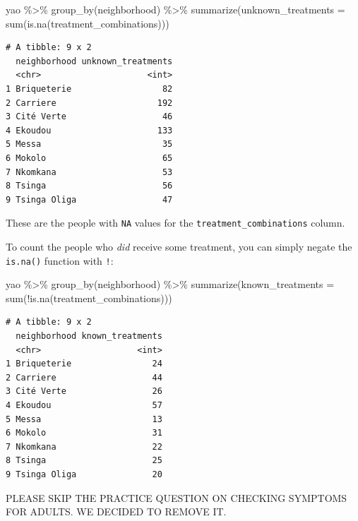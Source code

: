 \documentclass[
  letterpaper,
  DIV=11,
  numbers=noendperiod]{scrreprt}
\newenvironment{Shaded}{\begin{snugshade}}{\end{snugshade}}
\newcommand{\AttributeTok}[1]{\textcolor[rgb]{0.40,0.45,0.13}{#1}}
\newcommand{\FunctionTok}[1]{\textcolor[rgb]{0.28,0.35,0.67}{#1}}
\newcommand{\NormalTok}[1]{\textcolor[rgb]{0.00,0.23,0.31}{#1}}
\newcommand{\SpecialCharTok}[1]{\textcolor[rgb]{0.37,0.37,0.37}{#1}}
\begin{document}
\begin{Shaded}
\begin{Highlighting}[]
\NormalTok{yao }\SpecialCharTok{\%\textgreater{}\%} 
  \FunctionTok{group\_by}\NormalTok{(neighborhood) }\SpecialCharTok{\%\textgreater{}\%} 
  \FunctionTok{summarize}\NormalTok{(}\AttributeTok{unknown\_treatments =} \FunctionTok{sum}\NormalTok{(}\FunctionTok{is.na}\NormalTok{(treatment\_combinations)))}
\end{Highlighting}
\end{Shaded}

\begin{verbatim}
# A tibble: 9 x 2
  neighborhood unknown_treatments
  <chr>                     <int>
1 Briqueterie                  82
2 Carriere                    192
3 Cité Verte                   46
4 Ekoudou                     133
5 Messa                        35
6 Mokolo                       65
7 Nkomkana                     53
8 Tsinga                       56
9 Tsinga Oliga                 47
\end{verbatim}

These are the people with \texttt{NA} values for the
\texttt{treatment\_combinations} column.

To count the people who \emph{did} receive some treatment, you can
simply negate the \texttt{is.na()} function with \texttt{!}:

\begin{Shaded}
\begin{Highlighting}[]
\NormalTok{yao }\SpecialCharTok{\%\textgreater{}\%} 
  \FunctionTok{group\_by}\NormalTok{(neighborhood) }\SpecialCharTok{\%\textgreater{}\%} 
  \FunctionTok{summarize}\NormalTok{(}\AttributeTok{known\_treatments =} \FunctionTok{sum}\NormalTok{(}\SpecialCharTok{!}\FunctionTok{is.na}\NormalTok{(treatment\_combinations)))}
\end{Highlighting}
\end{Shaded}

\begin{verbatim}
# A tibble: 9 x 2
  neighborhood known_treatments
  <chr>                   <int>
1 Briqueterie                24
2 Carriere                   44
3 Cité Verte                 26
4 Ekoudou                    57
5 Messa                      13
6 Mokolo                     31
7 Nkomkana                   22
8 Tsinga                     25
9 Tsinga Oliga               20
\end{verbatim}

PLEASE SKIP THE PRACTICE QUESTION ON CHECKING SYMPTOMS FOR ADULTS. WE
DECIDED TO REMOVE IT.
\end{document}
